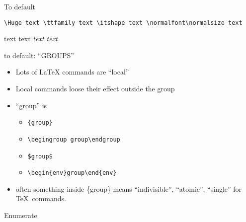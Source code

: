 \begin{frame}[fragile]{To default}

    \lstinline[basicstyle=\tt\normalsize]|\Huge text \ttfamily text \itshape text \normalfont\normalsize text|

     \Huge text \ttfamily text \itshape text \normalfont\normalsize text
\end{frame}

\begin{frame}[fragile]{to default: ``GROUPS''}\relax
    \begin{itemize}
    \item Lots of \LaTeX{} commands are ``local''
    \item Local commands loose their effect outside the group 
    \item ``group'' is
    \begin{itemize}
        \item \lstinline[basicstyle=\tt\normalsize]|{group}|
        \item \lstinline[basicstyle=\tt\normalsize]|\begingroup group\endgroup|
        \item \lstinline[basicstyle=\tt\normalsize]|$group$|
        \item \lstinline[basicstyle=\tt\normalsize]|\begin{env}group\end{env}|
    \end{itemize}
    \item often something inside \{group\} means ``indivisible'', ``atomic'', ``single'' for \TeX\ commands.
    \end{itemize}

\end{frame}


\begin{frame}[fragile]{Enumerate}\relax
\cprotect{}

\cprotect{}
    
    \cprotect{}
     
\end{frame}
\newlength{\myboxlen}%

